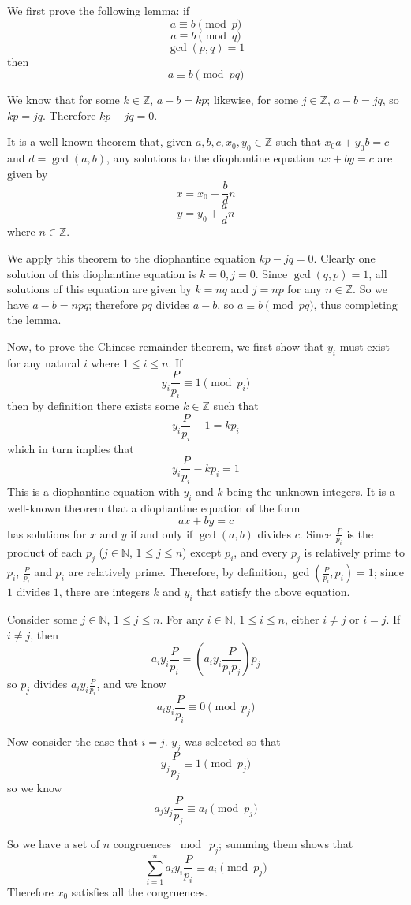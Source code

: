 \documentclass{article}
\begin{document}
We first prove the following lemma: if
\[a \equiv b \pmod{p}\]
\[a \equiv b \pmod{q}\]
\[\gcd(p,q)=1\]
then
\[a \equiv b \pmod{pq}\]

We know that for some $k \in \mathbb{Z}$, $a-b = kp$; likewise, for some $j \in \mathbb{Z}$, $a-b = jq$, so $kp = jq$.  Therefore $kp - jq = 0$.

It is a well-known theorem that, given $a,b,c,x_0,y_0 \in \mathbb{Z}$ such that $x_0a + y_0b = c$ and $d = \gcd(a,b)$, any solutions to the diophantine equation $ax + by = c$ are given by
$$x=x_0 + \frac{b}{d}n$$
$$y=y_0 + \frac{a}{d}n$$
where $n \in \mathbb{Z}$.

We apply this theorem to the diophantine equation $kp - jq = 0$.  Clearly one solution of this diophantine equation is $k = 0, j = 0$.  Since $\gcd(q,p)=1$, all solutions of this equation are given by $k=nq$ and $j=np$ for any $n \in \mathbb{Z}$.  So we have $a - b = npq$; therefore $pq$ divides $a - b$, so $a \equiv b \pmod{pq}$, thus completing the lemma.

Now, to prove the Chinese remainder theorem, we first show that $y_i$ must exist for any natural $i$ where $1 \leq i \leq n$.  If
$$y_i\frac{P}{p_i} \equiv 1 \pmod{p_i}$$
then by definition there exists some $k \in \mathbb{Z}$ such that
$$y_i\frac{P}{p_i} -1 = k p_i$$
which in turn implies that
$$y_i\frac{P}{p_i} - k p_i = 1$$
This is a diophantine equation with $y_i$ and $k$ being the unknown integers.  It is a well-known theorem that a diophantine equation of the form
$$ax + by = c$$
has solutions for $x$ and $y$ if and only if $\gcd(a,b)$ divides $c$.  Since $\frac{P}{p_i}$ is the product of each $p_j$ ($j \in \mathbb{N}$, $1 \leq j \leq n$) except $p_i$, and every $p_j$ is relatively prime to $p_i$, $\frac{P}{p_i}$ and $p_i$ are relatively prime.  Therefore, by definition, $\gcd(\frac{P}{p_i},p_i) = 1$; since $1$ divides $1$, there are integers $k$ and $y_i$ that satisfy the above equation.

Consider some $j \in \mathbb{N}$, $1 \leq j \leq n$.  For any $i \in \mathbb{N}$, $1 \leq i \leq n$, either $i\neq j$ or $i=j$.  If $i\neq j$, then
$$a_i y_i \frac{P}{p_i} = \left ( a_i y_i \frac{P}{p_i p_j} \right ) p_j$$
so $p_j$ divides $a_i y_i \frac{P}{p_i}$, and we know
$$a_i y_i \frac{P}{p_i} \equiv 0 \pmod{p_j}$$

Now consider the case that $i=j$.  $y_j$ was selected so that
$$y_j\frac{P}{p_j} \equiv 1 \pmod{p_j}$$
so we know
$$a_j y_j\frac{P}{p_j} \equiv a_i \pmod{p_j}$$

So we have a set of $n$ congruences $\bmod\ p_j$; summing them shows that
$$\sum_{i=1}^n a_i y_i \frac{P}{p_i} \equiv a_i \pmod{p_j}$$
Therefore $x_0$ satisfies all the congruences.
\end{document}
